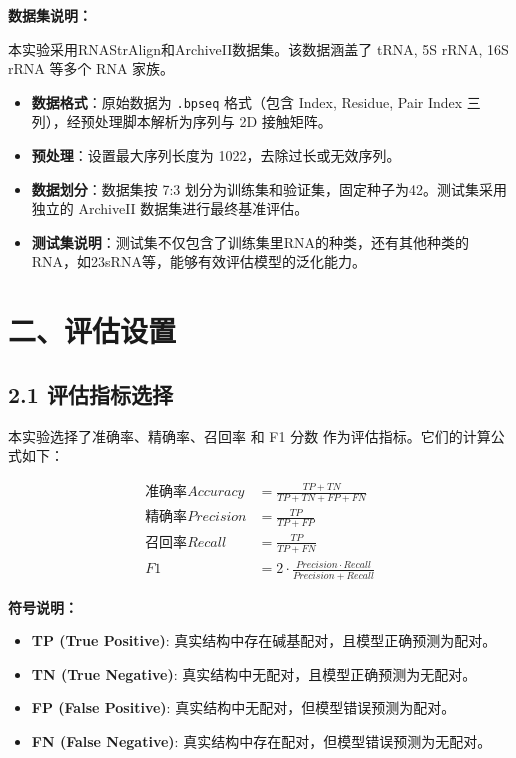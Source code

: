 \documentclass[a4paper,12pt]{article}
\begin{document}
\noindent \textbf{数据集说明：}

本实验采用RNAStrAlign和ArchiveII数据集。该数据涵盖了 tRNA, 5S rRNA, 16S rRNA 等多个 RNA 家族。
\begin{itemize}
    \item \textbf{数据格式}：原始数据为 \texttt{.bpseq} 格式（包含 Index, Residue, Pair Index 三列），经预处理脚本解析为序列与 2D 接触矩阵。
    \item \textbf{预处理}：设置最大序列长度为 1022，去除过长或无效序列。
    \item \textbf{数据划分}：数据集按 7:3 划分为训练集和验证集，固定种子为42。测试集采用独立的 ArchiveII 数据集进行最终基准评估。
    \item \textbf{测试集说明}：测试集不仅包含了训练集里RNA的种类，还有其他种类的RNA，如23sRNA等，能够有效评估模型的泛化能力。
\end{itemize}

\newpage

\section*{二、评估设置}

\subsection*{2.1 评估指标选择}
\noindent 本实验选择了准确率、精确率、召回率 和 F1 分数 作为评估指标。它们的计算公式如下：

\begin{equation}
\begin{aligned}
\text{准确率}Accuracy &= \frac{TP + TN}{TP + TN + FP + FN} \\
\text{精确率}Precision &= \frac{TP}{TP + FP} \\
\text{召回率}Recall &= \frac{TP}{TP + FN} \\
F1 &= 2 \cdot \frac{Precision \cdot Recall}{Precision + Recall}
\end{aligned}
\end{equation}

\noindent \textbf{符号说明：}
\begin{itemize}
    \item \textbf{TP (True Positive)}: 真实结构中存在碱基配对，且模型正确预测为配对。
    \item \textbf{TN (True Negative)}: 真实结构中无配对，且模型正确预测为无配对。
    \item \textbf{FP (False Positive)}: 真实结构中无配对，但模型错误预测为配对。
    \item \textbf{FN (False Negative)}: 真实结构中存在配对，但模型错误预测为无配对。
\end{itemize}
\end{document}

